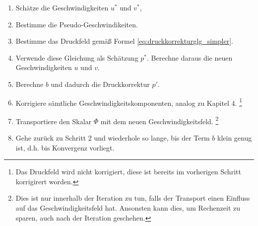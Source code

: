 \begin{enumerate}
\item Sch\"atze die Geschwindigkeiten $u^{*}$ und $v^{*}$,
\item Bestimme die Pseudo-Geschwindikeiten.
\item Bestimme das Druckfeld gem\"a\ss{} Formel \eqref{eq:druckkorrekturglg_simpler}.
\item Verwende diese Gleichung als Sch\"atzung $p^{*}$. Berechne daraus die neuen Geschwindigkeiten $u$ und $v$.
\item Berechne $b$ und dadurch die Druckkorrektur $p'$.
\item Korrigiere s\"amtliche Geschwindigkeitskomponenten, analog zu Kapitel 4. \footnote{Das Druckfeld wird nicht korrigiert, diese ist bereits im vorherigen Schritt korrigirert worden.}
\item Transportiere den Skalar $\Phi$ mit dem neuen Geschwindigkeitsfeld. \footnote{Dies ist nur innerhalb der Iteration zu tun, falls der Transport einen Einfluss auf das Geschwindigkeitsfeld hat. Ansonsten kann dies, um Rechenzeit zu sparen, auch nach der Iteration geschehen.}
\item Gehe zur\"uck zu Schritt 2 und wiederhole so lange, bis der Term $b$ klein genug ist, d.h. bis Konvergenz vorliegt.
\end{enumerate}
